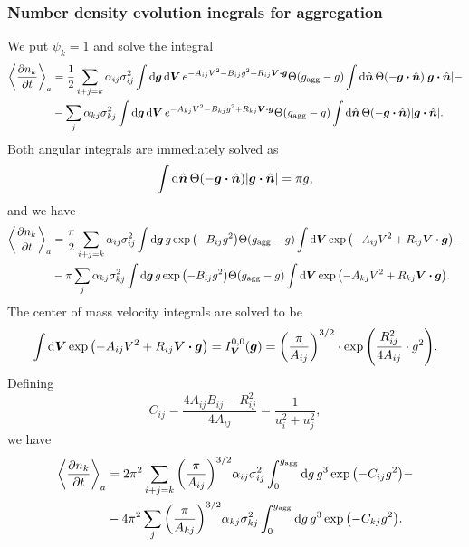 \documentclass[aps,prl,preprint,groupedaddress,10pt]{revtex4-2}
\begin{document}
\subsubsection{Number density evolution inegrals for aggregation}
We put $\psi_k=1$ and solve the integral
\begin{equation}
    \begin{split}
        \avg{\pdv{n_k}{t}}_a&=\frac{1}{2}\sum_{i+j=k}\alpha_{ij}\sigma_{ij}^2
        \int\dd{\bg}\dd{\bV}e^{-A_{ij}V^2-B_{ij}g^2+R_{ij}\bV\vdot\bg}\Theta(\ltx{g}{agg}-g)
        \int\dd{\bn}\Theta\pqty{-\bg\vdot\bn}\abs{\bg\vdot\bn}-\\
        &-\sum_{j}\alpha_{kj}\sigma_{kj}^2\int\dd{\bg}\dd{\bV}e^{-A_{kj}V^2-B_{kj}g^2+R_{kj}\bV\vdot\bg}
        \Theta(\ltx{g}{agg}-g)\int\dd{\bn}\Theta\pqty{-\bg\vdot\bn}\abs{\bg\vdot\bn}.
    \end{split}
\end{equation}
Both angular integrals are immediately solved as
\begin{equation}
    \int\dd{\bn}\Theta\pqty{-\bg\vdot\bn}\abs{\bg\vdot\bn}=\pi g,
\end{equation}
and we have
\begin{equation}
    \begin{split}
        \avg{\pdv{n_k}{t}}_a&=\frac{\pi}{2}\sum_{i+j=k}\alpha_{ij}\sigma_{ij}^2
        \int\dd{\bg}g\exp\pqty{-B_{ij}g^2}\Theta(\ltx{g}{agg}-g)
        \int\dd{\bV}\exp\pqty{-A_{ij}V^2+R_{ij}\bV\vdot\bg}-\\
        &-\pi\sum_{j}\alpha_{kj}\sigma_{kj}^2\int\dd{\bg}g\exp\pqty{-B_{ij}g^2}\Theta(\ltx{g}{agg}-g)
        \int\dd{\bV}\exp\pqty{-A_{kj}V^2+R_{kj}\bV\vdot\bg}.
    \end{split}
\end{equation}
The center of mass velocity integrals are solved to be
\begin{equation}
    \int\dd{\bV}\exp\pqty{-A_{ij}V^2+R_{ij}\bV\vdot\bg}=I_{\bV}^{0,0}(\bg)=
    \pqty{\frac{\pi}{A_{ij}}}^{3/2}\cdot\exp\pqty{\frac{R_{ij}^2}{4A_{ij}}\cdot g^2}.
\end{equation}
Defining
\begin{equation}
    C_{ij}=\frac{4A_{ij}B_{ij}-R_{ij}^2}{4A_{ij}}=\frac{1}{u_i^2+u_j^2},
\end{equation}
we have
\begin{equation}
    \begin{split}
        \avg{\pdv{n_k}{t}}_a&=2\pi^2\sum_{i+j=k}\pqty{\frac{\pi}{A_{ij}}}^{3/2}
        \alpha_{ij}\sigma_{ij}^2\int_{0}^{\ltx{g}{agg}}\dd{g}g^3\exp\pqty{-C_{ij}g^2}-\\
        &-4\pi^2\sum_{j}\pqty{\frac{\pi}{A_{kj}}}^{3/2}\alpha_{kj}\sigma_{kj}^2
        \int_{0}^{\ltx{g}{agg}}\dd{g}g^3\exp\pqty{-C_{kj}g^2}.
    \end{split}
\end{equation}
\end{document}

